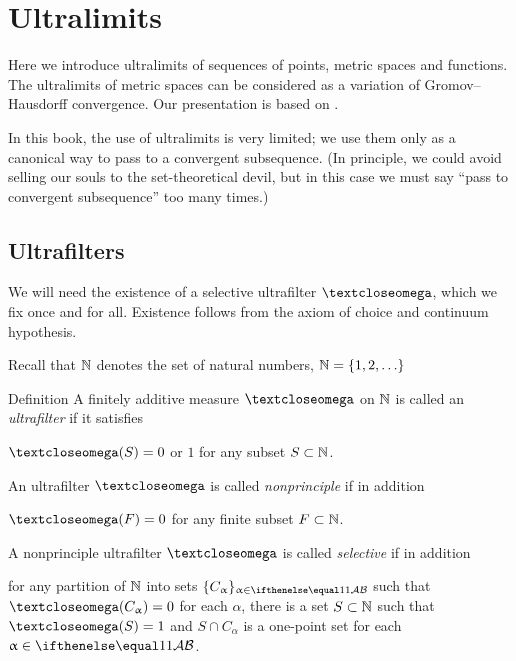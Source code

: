 \chapter{Ultralimits}

Here we introduce ultralimits of sequences of points, metric spaces and functions.
The ultralimits of metric spaces can be considered as a variation of Gromov--Hausdorff convergence.
Our presentation is based on \cite{kleiner-leeb}.

In this book, the use of ultralimits is very limited; 
we use them only as a canonical way to pass to a convergent subsequence.
(In principle, we could avoid selling our souls 
to the set-theoretical devil, but in this case we must say ``pass to convergent subsequence'' too many times.)

\section{Ultrafilters}

We will need the existence of a 
selective ultrafilter $\o$,
which we fix once and for all.
Existence follows from the axiom of choice and continuum hypothesis.

Recall that $\mathbb{N}$ denotes the set of natural numbers, $\NN=\{1,2,\dots\}$

\begin{thm}{Definition}
A finitely additive measure $\o$ 
on  $\mathbb{N}$ 
is called an \emph{ultrafilter} if it satisfies 
\begin{subthm}{}
$\o(S)=0$ or $1$ for any subset $S\subset \NN$.
\end{subthm}
An ultrafilter $\o$ is called 
\emph{nonprinciple} if in addition 
\begin{subthm}{}
$\o(F)=0$ for any finite subset $F\subset \NN$.
\end{subthm}
A nonprinciple ultrafilter $\o$ is called 
\emph{selective} if in addition 
\begin{subthm}{}
for any partition of $\mathbb{N}$ into sets $\{C_\alpha\}_{\alpha\in\IndexSet}$ such that $\o(C_\alpha)\z=0$ for each $\alpha$, 
there is a set $S\subset \NN$ such that $\o(S)=1$ and $S\cap C_\alpha$ is a one-point set for each $\alpha\in\IndexSet$.
\end{subthm}
\end{thm}


